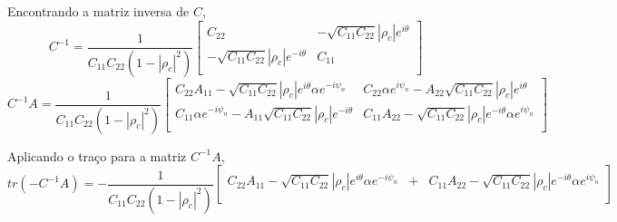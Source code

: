 \documentclass[12pt,a4paper]{article}
\begin{document}
Encontrando a matriz inversa de $C$,
\begin{equation}\label{sec1eqn44}
	C^{-1}=\frac{1}{C_{11}C_{22}(1-\left|\rho_c\right|^2)}\left[
\begin{array}{cc}
	C_{22}              & -\sqrt{C_{11}C_{22}}\left|\rho_c \right|e^{i\theta} \\
 -\sqrt{C_{11}C_{22}}\left|\rho_c \right|e^{-i\theta} & C_{11}\\
\end{array}\right]
\end{equation}
\begin{equation}\label{sec1eqn45}
	C^{-1}A=\frac{1}{C_{11}C_{22}(1-\left|\rho_c\right|^2)}\left[
\begin{array}{cc}
	C_{22}A_{11}-\sqrt{C_{11}C_{22}}\left|\rho_c \right|e^{i\theta}\alpha e^{-i\psi_n} & C_{22} \alpha e^{i\psi_n}-A_{22}\sqrt{C_{11}C_{22}}\left|\rho_c \right|e^{i\theta} \\
	C_{11}\alpha e^{-i\psi_n}-A_{11}\sqrt{C_{11}C_{22}}\left|\rho_c \right|e^{-i\theta} & C_{11}A_{22}-\sqrt{C_{11}C_{22}}\left|\rho_c \right|e^{-i\theta}\alpha e^{i\psi_n} \\
\end{array}\right]
\end{equation}

Aplicando o traço para a matriz $C^{-1}A$,
{\footnotesize
\begin{equation}\label{sec1eqn46}
	tr(-C^{-1}A)=-\frac{1}{C_{11}C_{22}(1-\left|\rho_c\right|^2)}\left[
\begin{array}{ccc}
	C_{22}A_{11}-\sqrt{C_{11}C_{22}}\left|\rho_c \right|e^{i\theta}\alpha e^{-i\psi_n} &+& C_{11}A_{22}-\sqrt{C_{11}C_{22}}\left|\rho_c \right|e^{-i\theta}\alpha e^{i\psi_n} \\
\end{array}\right]
\end{equation}}
\end{document}
